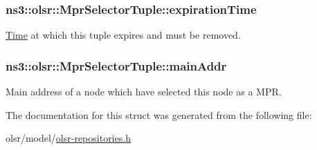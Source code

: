 \subsubsection[{\texorpdfstring{expiration\+Time}{expirationTime}}]{ ns3\+::olsr\+::\+Mpr\+Selector\+Tuple\+::expiration\+Time}\hypertarget{structns3_1_1olsr_1_1MprSelectorTuple_ace6344f90e31124d0146ba3bdef6de89}{}\label{structns3_1_1olsr_1_1MprSelectorTuple_ace6344f90e31124d0146ba3bdef6de89}


\hyperlink{classns3_1_1Time}{Time} at which this tuple expires and must be removed. 

\subsubsection[{\texorpdfstring{main\+Addr}{mainAddr}}]{ ns3\+::olsr\+::\+Mpr\+Selector\+Tuple\+::main\+Addr}\hypertarget{structns3_1_1olsr_1_1MprSelectorTuple_a7e1e37f791d34c0e3e0e2b57ab5d1925}{}\label{structns3_1_1olsr_1_1MprSelectorTuple_a7e1e37f791d34c0e3e0e2b57ab5d1925}


Main address of a node which have selected this node as a M\+PR. 



The documentation for this struct was generated from the following file\+:\begin{DoxyCompactItemize}
\item 
olsr/model/\hyperlink{olsr-repositories_8h}{olsr-\/repositories.\+h}\end{DoxyCompactItemize}

